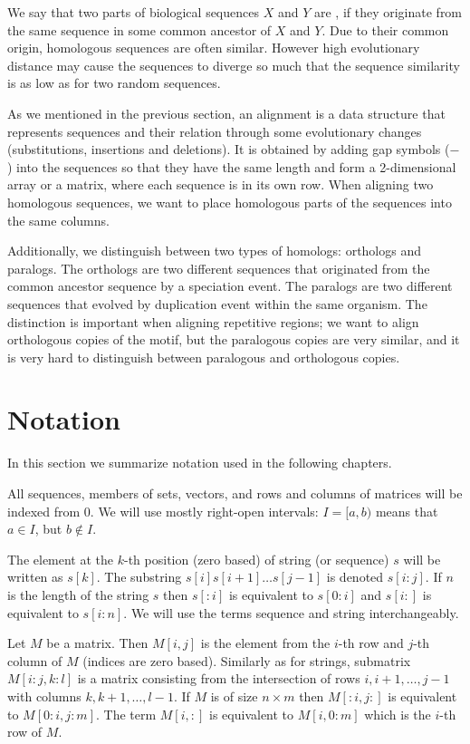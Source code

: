 We say that two parts of biological sequences $X$ and $Y$ are
, if they originate from the same sequence in some
common ancestor of $X$ and $Y$. Due to their common origin, homologous sequences are often similar.
However high evolutionary
distance may cause the sequences to diverge so much that the sequence
similarity is as low as for two random sequences.

As we mentioned in the previous section, an alignment is a data structure that
represents sequences and their relation through some evolutionary changes
(substitutions, insertions and deletions).  It is obtained by adding gap
symbols ($-$) into the sequences so that they have the same length and form a
2-dimensional array or a matrix, where each sequence is in its own row. When
aligning two homologous sequences, we want to place
homologous parts of the sequences into the same columns.

Additionally, we distinguish between two types of homologs: orthologs and
paralogs. The orthologs are two different sequences that originated from the
common ancestor sequence by a speciation event. The paralogs are two different
sequences that evolved by duplication event within the same organism. The
distinction is important when aligning repetitive regions; we want to align
orthologous copies of the motif, but the paralogous copies are very similar, and it is very
hard to distinguish between paralogous and orthologous copies.

\section{Notation}

In this section we summarize notation used in the following
chapters.

All sequences, members of sets, vectors, and rows and columns of matrices will
be indexed from $0$. We will use mostly right-open intervals: $I=[a,b)$ means
that $a\in I$, but $b\notin I$. 

The element at the $k$-th position (zero based) of string (or sequence) $s$ will
be written as $s[k]$. The substring $s[i]s[i+1]\dots s[j-1]$ is denoted
$s[i:j]$.  If $n$ is the length of the string $s$ then $s[:i]$ is equivalent to
$s[0:i]$ and $s[i:]$ is equivalent to $s[i:n]$.  We will use the terms sequence
and string interchangeably.

Let $M$ be a matrix. Then $M[i,j]$ is the element from the $i$-th row and $j$-th
column of $M$ (indices are zero based). Similarly as for strings, submatrix
$M[i:j,k:l]$ is a matrix consisting from the intersection of rows $i,i+1,\dots,
j-1$ with columns $k,k+1,\dots,l-1$. If $M$ is of size $n\times m$ then
$M[:i,j:]$ is equivalent to $M[0:i,j:m]$.  The term $M[i,:]$ is equivalent to
$M[i,0:m]$ which is the $i$-th row of $M$.
